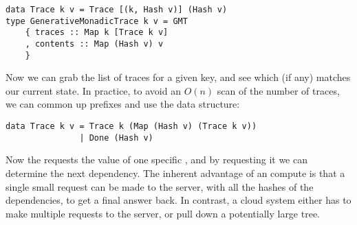 \begin{verbatim}
data Trace k v = Trace [(k, Hash v)] (Hash v)
type GenerativeMonadicTrace k v = GMT
    { traces :: Map k [Trace k v]
    , contents :: Map (Hash v) v
    }
\end{verbatim}

Now we can grab the list of traces for a given key, and see which (if any) matches our current state. In practice, to avoid an $O(n)$ scan of the number of traces, we can common up prefixes and use the data structure:

\begin{verbatim}
data Trace k v = Trace k (Map (Hash v) (Trace k v))
               | Done (Hash v)
\end{verbatim}

Now the  requests the value of one specific , and by requesting it we can determine the next dependency. The inherent advantage of an  compute is that a single small request can be made to the server, with all the hashes of the dependencies, to get a final answer back. In contrast, a  cloud system either has to make multiple requests to the server, or pull down a potentially large  tree.


